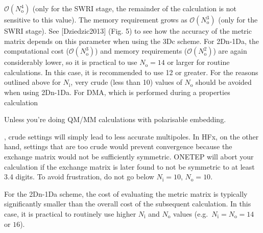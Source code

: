 \documentclass[letterpaper,10pt,english]{sphinxmanual}
\begin{document}
\({\mathcal{O}}(N^4_{\textrm{o}})\) (only for the SWRI stage, the
remainder of the calculation is not sensitive to this value). The memory
requirement grows as \({\mathcal{O}}(N^3_{\textrm{o}})\) (only for
the SWRI stage). See {[}Dziedzic2013{]} (Fig. 5) to see how the
accuracy of the metric matrix depends on this parameter when using the
3Dc scheme. For 2Dn-1Da, the computational cost
(\({\mathcal{O}}(N^{3}_{\textrm{o}})\)) and memory requirements
(\({\mathcal{O}}(N^{2}_{\textrm{o}})\)) are again considerably
lower, so it is practical to use \(N_{\textrm{o}}=14\) or larger for
routine calculations. In this case, it is recommended to use 12 or
greater. For the reasons outlined above for \(N_{\textrm{i}}\), very
crude (less than 10) values of \(N_{\textrm{o}}\) should be avoided
when using 2Dn-1Da. For DMA, which is performed during a properties
calculation %
\begin{footnote}[2]\sphinxAtStartFootnote
Unless you’re doing QM/MM calculations with polarisable embedding.
%
\end{footnote}, crude settings will simply lead to less accurate
multipoles. In HFx, on the other hand, settings that are too crude would
prevent convergence because the exchange matrix would not be
sufficiently symmetric. ONETEP will abort your calculation if the
exchange matrix is later found to not be symmetric to at least 3.4
digits. To avoid frustration, do not go below \(N_{\textrm{i}}=10\),
\(N_{\textrm{o}}=10\).

For the 2Dn-1Da scheme, the cost of evaluating the metric matrix is
typically significantly smaller than the overall cost of the subsequent
calculation. In this case, it is practical to routinely use higher
\(N_{\textrm{i}}\) and \(N_{\textrm{o}}\) values
(e.g. \(N_{\textrm{i}} = N_{\textrm{o}} = 14\) or \(16\)).
\end{document}
